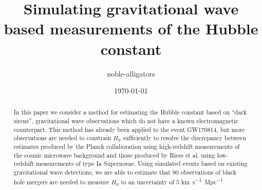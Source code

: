 \documentclass[a4paper, amsfonts, amssymb, amsmath, reprint, showkeys, nofootinbib, twoside]{revtex4-1}
\begin{document}
\title{Simulating gravitational wave based measurements of the Hubble constant}

\author{noble-alligators}

\date{\today} %

\begin{abstract}
    In this paper we consider a method for estimating the Hubble constant based on ``dark sirens'', gravitational wave observations which do not have a known electromagnetic counterpart. This method has already been applied to the event GW170814, but more observations are needed to constrain $H_0$ sufficiently to resolve the discrepancy between estimates produced by the Planck collaboration using high-redshift measurements of the cosmic microwave background and those produced by Riess et al. using low-redshift measurements of type Ia Supernovae. Using simulated events based on existing gravitational wave detections, we are able to estimate that $90$ observations of black hole mergers are needed to measure $H_0$ to an uncertainty of $5$ \si{km.s^{-1}.Mpc^{-1}}.
\end{abstract}


\maketitle




%


%

%
%


\appendix

\end{document}
